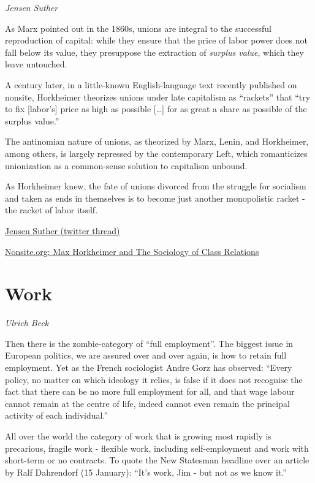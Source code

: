 \documentclass[
]{book}
\begin{document}
\emph{Jensen Suther}

As Marx pointed out in the 1860s, unions are integral to the successful reproduction of capital: while they ensure that the price of labor power does not fall below its value, they presuppose the extraction of \emph{surplus value}, which they leave untouched.

A century later, in a little-known English-language text recently published on nonsite, Horkheimer theorizes unions under late capitalism as ``rackets'' that ``try to fix {[}labor's{]} price as high as possible {[}\ldots{]} for as great a share as possible of the surplus value.''

The antinomian nature of unions, as theorized by Marx, Lenin, and Horkheimer, among others, is largely repressed by the contemporary Left, which romanticizes unionization as a common-sense solution to capitalism unbound.

As Horkheimer knew, the fate of unions divorced from the struggle for socialism and taken as ends in themselves is to become just another monopolistic racket - the racket of labor itself.

\href{https://twitter.com/jensensuther/status/1396925484131184641}{Jensen Suther (twitter thread)}

\href{https://nonsite.org/max-horkheimer-and-the-sociology-of-class-relations/}{Nonsite.org: Max Horkheimer and The Sociology of Class Relations}

\hypertarget{work}{%
\chapter{Work}\label{work}}

\emph{Ulrich Beck}

Then there is the zombie-category of ``full employment''. The biggest issue in European politics, we are assured over and over again, is how to retain full employment. Yet as the French sociologist Andre Gorz has observed: ``Every policy, no matter on which ideology it relies, is false if it does not recognise the fact that there can be no more full employment for all, and that wage labour cannot remain at the centre of life, indeed cannot even remain the principal activity of each individual.''

All over the world the category of work that is growing most rapidly is precarious, fragile work - flexible work, including self-employment and work with short-term or no contracts. To quote the New Statesman headline over an article by Ralf Dahrendorf (15 January): ``It's work, Jim - but not as we know it.''
\end{document}

